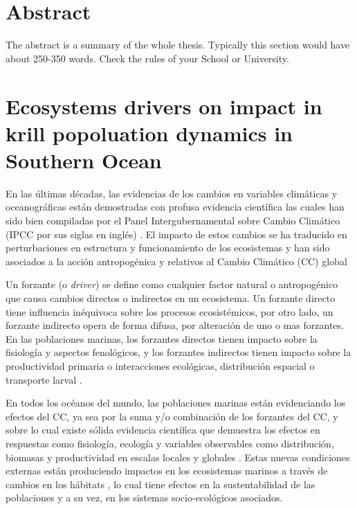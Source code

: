 \documentclass{umagthesis}
\begin{document}
\hypertarget{abstract}{%
\chapter*{Abstract}\label{abstract}}

The abstract is a summary of the whole thesis. Typically this section would have about 250-350 words. Check the rules of your School or University.

\clearpage{}\setcounter{page}{0}

\hypertarget{ch:intro}{%
\chapter{Ecosystems drivers on impact in krill popoluation dynamics in Southern Ocean}\label{ch:intro}}

\quad

En las últimas décadas, las evidencias de los cambios en variables climáticas y oceanográficas están demostradas con profusa evidencia científica las cuales han sido bien compiladas por el Panel Intergubernamental sobre Cambio Climático (IPCC por sus siglas en inglés) \autocite{IPCC2014}. El impacto de estos cambios se ha traducido en perturbaciones en estructura y funcionamiento de los ecosistemas y han sido asociados a la acción antropogénica \autocite{Marshall2018} \autocite{Worm2012} y relativos al Cambio Climático (CC) global \autocite{Bryndum-Buchholz2019,Rijnsdorp2009} \autocite{Arana2020b,Arcos2004,Worm2012}

Un forzante (o \emph{driver}) se define como cualquier factor natural o antropogénico que causa cambios directos o indirectos en un ecosistema. Un forzante directo tiene influencia inéquivoca sobre los procesos ecosistémicos, por otro lado, un forzante indirecto opera de forma difusa, por alteración de uno o mas forzantes. En las poblaciones marinas, los forzantes directos tienen impacto sobre la fisiología y aspectos fenológicos, y los forzantes indirectos tienen impacto sobre la productividad primaria o interacciones ecológicas, distribución espacial o transporte larval \autocite{Koenigstein2016}.

En todos los océanos del mundo, las poblaciones marinas están evidenciando los efectos del CC, ya sea por la suma y/o combinación de los forzantes del CC, y sobre lo cual existe sólida evidencia científica que demuestra los efectos en respuestas como fisiología, ecología y variables observables como distribución, biomasas y productividad en escalas locales y globales \autocite{Barange2014,Bryndum-Buchholz2019,Perry2005,Rijnsdorp2009}. Estas nuevas condiciones externas están produciendo impactos en los ecosistemas marinos a través de cambios en los hábitats \autocite{Bryndum-Buchholz2019,Shoji2011,Rijnsdorp2009,Hidalgo2018}, lo cual tiene efectos en la sustentabilidad de las poblaciones y a su vez, en los sistemas socio-ecológicos asociados.
\end{document}

